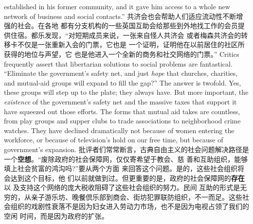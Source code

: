 \begin{paracol}{2}
established in his former community, and it gave him access to
a whole new network of business and social contacts.''
\switchcolumn
共济会也会帮助人们适应流动性不断增强的社会。在各地
都有分支机构的一些英国互助会给那些到外地找工作的会员提
供住宿。都乐发现，“对短期成员来说，一张来自怪人共济会
或者梅森共济会的转移卡不仅是一张重新入会的门票，它也是
一个证明，证明他在以前居住的社区所获得的地位与声望，它
也是他进入一个全新的商务和社交网络的门票。”
\switchcolumn*
Critics frequently assert that libertarian solutions to social
problems are fantastical. ``Eliminate the government's safety
net, and just \textit{hope} that churches, charities, and mutual-aid
groups will expand to fill the gap?'' The answer is twofold. Yes,
these groups will step up to the plate; they always have. But
more important, the \textit{existence} of the government's safety net and
the massive taxes that support it have squeezed out those efforts. The forms that mutual aid takes are countless, from play
groups and supper clubs to trade associations to neighborhood
crime watches. They have declined dramatically not because of
women entering the workforce, or because of television's hold
on our free time, but because of government's expansion.
\switchcolumn
批评者们常常断言，古典自由主义的社会问题解决路径是
一个\textbf{空想}。“废除政府的社会保障网，仅仅寄希望于教会、慈
善和互助组织，能够填上社会贫富的鸿沟吗?”要从两个方面
来回答这个问题。是的，这些社会组织将会达到这个目标，他
们以前就做到过。但更重要的是，政府的社会保障网的\textbf{存在}以
及支持这个网络的庞大税收阻碍了这些社会组织的努力。民间
互助的形式是无穷的，从亲子游乐坊、晚餐倶乐部到商会、街坊犯罪联防组织，不一而足。这些社会组织的戏剧性衰落不是因为妇女进入劳动力市场，也不是因为电视占领了我们的空闲
时间，而是因为政府的扩张。


\end{paracol}
